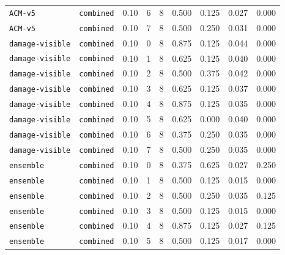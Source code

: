 \documentclass{article}
\begin{document}
\begin{center}
\begin{tabular}{llccccccc}
\texttt{ACM-v5} & \texttt{combined} & 0.10 & 6 & 8 & 0.500 & 0.125 & 0.027 & 0.000 \\
\texttt{ACM-v5} & \texttt{combined} & 0.10 & 7 & 8 & 0.500 & 0.250 & 0.031 & 0.000 \\
\texttt{damage-visible} & \texttt{combined} & 0.10 & 0 & 8 & 0.875 & 0.125 & 0.044 & 0.000 \\
\texttt{damage-visible} & \texttt{combined} & 0.10 & 1 & 8 & 0.625 & 0.125 & 0.040 & 0.000 \\
\texttt{damage-visible} & \texttt{combined} & 0.10 & 2 & 8 & 0.500 & 0.375 & 0.042 & 0.000 \\
\texttt{damage-visible} & \texttt{combined} & 0.10 & 3 & 8 & 0.625 & 0.125 & 0.037 & 0.000 \\
\texttt{damage-visible} & \texttt{combined} & 0.10 & 4 & 8 & 0.875 & 0.125 & 0.035 & 0.000 \\
\texttt{damage-visible} & \texttt{combined} & 0.10 & 5 & 8 & 0.625 & 0.000 & 0.040 & 0.000 \\
\texttt{damage-visible} & \texttt{combined} & 0.10 & 6 & 8 & 0.375 & 0.250 & 0.035 & 0.000 \\
\texttt{damage-visible} & \texttt{combined} & 0.10 & 7 & 8 & 0.500 & 0.250 & 0.035 & 0.000 \\
\texttt{ensemble} & \texttt{combined} & 0.10 & 0 & 8 & 0.375 & 0.625 & 0.027 & 0.250 \\
\texttt{ensemble} & \texttt{combined} & 0.10 & 1 & 8 & 0.500 & 0.125 & 0.015 & 0.000 \\
\texttt{ensemble} & \texttt{combined} & 0.10 & 2 & 8 & 0.500 & 0.250 & 0.035 & 0.125 \\
\texttt{ensemble} & \texttt{combined} & 0.10 & 3 & 8 & 0.500 & 0.125 & 0.015 & 0.000 \\
\texttt{ensemble} & \texttt{combined} & 0.10 & 4 & 8 & 0.875 & 0.125 & 0.027 & 0.125 \\
\texttt{ensemble} & \texttt{combined} & 0.10 & 5 & 8 & 0.500 & 0.125 & 0.017 & 0.000 \\
\bottomrule
\end{tabular}
\end{center}
\end{document}
